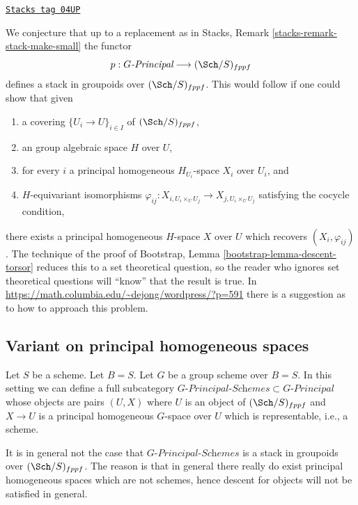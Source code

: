 \begin{remark}
\label{examples-stacks-remark-principal-stack-in-groupoids}
\href{https://stacks.math.columbia.edu/tag/04UP}{\texttt{Stacks tag 04UP}}

We conjecture that up to a replacement as in
Stacks, Remark \ref{stacks-remark-stack-make-small}
the functor
$$
p : G\textit{-Principal} \longrightarrow (\Sch/S)_{fppf}
$$
defines a stack in groupoids over $(\Sch/S)_{fppf}$. This would
follow if one could show that given
\begin{enumerate}
\item a covering $\{U_i \to U\}_{i \in I}$ of $(\Sch/S)_{fppf}$,
\item an group algebraic space $H$ over $U$,
\item for every $i$ a principal homogeneous $H_{U_i}$-space $X_i$
over $U_i$, and
\item $H$-equivariant isomorphisms
$\varphi_{ij} : X_{i, U_i \times_U U_j} \to X_{j, U_i \times_U U_j}$
satisfying the cocycle condition,
\end{enumerate}
there exists a principal homogeneous $H$-space $X$ over $U$
which recovers $(X_i, \varphi_{ij})$. The technique of the proof of
Bootstrap, Lemma \ref{bootstrap-lemma-descent-torsor}
reduces this to a set theoretical question, so the reader who ignores
set theoretical questions will ``know'' that the result is true. In
\url{https://math.columbia.edu/~dejong/wordpress/?p=591}
there is a suggestion as to how to approach this problem.
\end{remark}


\subsection{Variant on principal homogeneous spaces}
\label{examples-stacks-subsection-variant-principal-homogeneous-spaces}

Let $S$ be a scheme. Let $B = S$.
Let $G$ be a group scheme over $B = S$.
In this setting we can define a full subcategory
$G\textit{-Principal-Schemes} \subset G\textit{-Principal}$
whose objects are pairs $(U, X)$ where $U$ is an object of
$(\Sch/S)_{fppf}$ and $X \to U$ is a principal homogeneous
$G$-space over $U$ which is representable, i.e., a scheme.

\medskip\noindent
It is in general not the case that $G\textit{-Principal-Schemes}$ is
a stack in groupoids over $(\Sch/S)_{fppf}$. The reason is
that in general there really do exist principal homogeneous spaces
which are not schemes, hence descent for objects will not be satisfied
in general.



